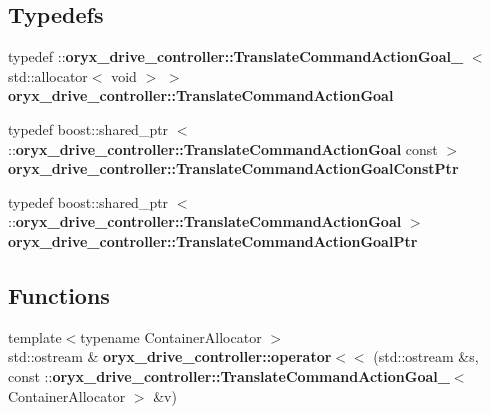 \subsection*{\-Typedefs}
\begin{DoxyCompactItemize}
\item 
typedef \*
\-::{\bf oryx\-\_\-drive\-\_\-controller\-::\-Translate\-Command\-Action\-Goal\-\_\-}\*
$<$ std\-::allocator$<$ void $>$ $>$ {\bf oryx\-\_\-drive\-\_\-controller\-::\-Translate\-Command\-Action\-Goal}
\item 
typedef boost\-::shared\-\_\-ptr\*
$<$ \-::{\bf oryx\-\_\-drive\-\_\-controller\-::\-Translate\-Command\-Action\-Goal} \*
const  $>$ {\bf oryx\-\_\-drive\-\_\-controller\-::\-Translate\-Command\-Action\-Goal\-Const\-Ptr}
\item 
typedef boost\-::shared\-\_\-ptr\*
$<$ \-::{\bf oryx\-\_\-drive\-\_\-controller\-::\-Translate\-Command\-Action\-Goal} $>$ {\bf oryx\-\_\-drive\-\_\-controller\-::\-Translate\-Command\-Action\-Goal\-Ptr}
\end{DoxyCompactItemize}
\subsection*{\-Functions}
\begin{DoxyCompactItemize}
\item 
{\footnotesize template$<$typename Container\-Allocator $>$ }\\std\-::ostream \& {\bf oryx\-\_\-drive\-\_\-controller\-::operator$<$$<$} (std\-::ostream \&s, const \-::{\bf oryx\-\_\-drive\-\_\-controller\-::\-Translate\-Command\-Action\-Goal\-\_\-}$<$ \-Container\-Allocator $>$ \&v)
\end{DoxyCompactItemize}
